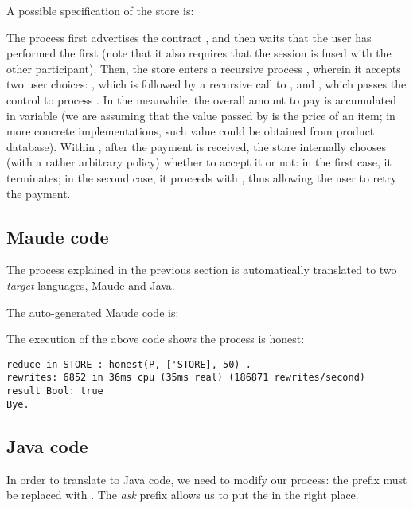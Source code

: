 
A possible specification of the store is:


The process  first advertises the contract
, and then waits that the user has performed the
first  %
(note that it also requires that the session  is fused with the other participant). %
Then, the store enters a recursive process ,
wherein it accepts two user choices: , which is
followed by a recursive call to , and
, which passes the control to process
.  In the meanwhile, the overall amount to pay
is accumulated in variable  (we are assuming that the value 
passed by  is the price of an item; in more
concrete implementations, such value could be obtained \eg from
product database). %
Within , after the payment is received, the
store internally chooses (with a rather arbitrary policy) whether to
accept it or not: %
in the first case, it terminates; %
in the second case, it proceeds with , thus
allowing the user to retry the payment.

\subsection{Maude code}
The process explained in the previous section is automatically translated to two \textit{target} languages, Maude and Java.

The auto-generated Maude code is:

The execution of the above code shows the process  is honest:
\begin{lstlisting}
reduce in STORE : honest(P, ['STORE], 50) .
rewrites: 6852 in 36ms cpu (35ms real) (186871 rewrites/second)
result Bool: true
Bye.
\end{lstlisting}

\subsection{Java code}
In order to translate to Java code, we need to modify our process: the prefix  must be replaced with . The \textit{ask} prefix allows us to put the 
in the right place.

